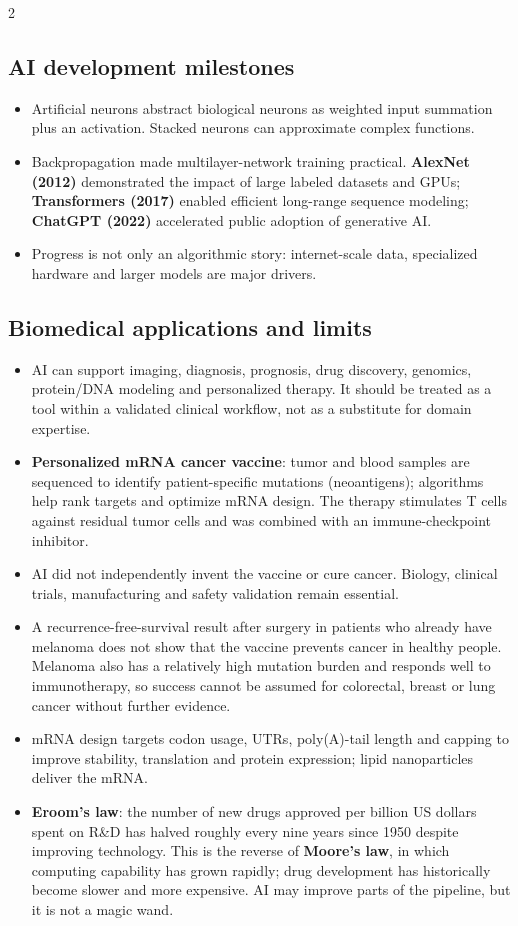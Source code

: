 \documentclass[10pt,a4paper]{ctexart}
\newcommand{\key}[1]{\textbf{#1}}
\begin{document}
\begin{multicols*}{2}
\subsection{AI development milestones}
\begin{itemize}
  \item Artificial neurons abstract biological neurons as weighted input summation plus an activation. 
  Stacked neurons can approximate complex functions.
  \item Backpropagation made multilayer-network training practical. \key{AlexNet (2012)} demonstrated the impact of large labeled 
  datasets and GPUs; \key{Transformers (2017)} enabled efficient long-range sequence modeling; \key{ChatGPT (2022)} accelerated 
  public adoption of generative AI.
  \item Progress is not only an algorithmic story: internet-scale data, specialized hardware and larger models are major drivers.
\end{itemize}

\subsection{Biomedical applications and limits}
\begin{itemize}
  \item AI can support imaging, diagnosis, prognosis, drug discovery, genomics, protein/DNA modeling and personalized therapy. 
  It should be treated as a tool within a validated clinical workflow, not as a substitute for domain expertise.
  \item \key{Personalized mRNA cancer vaccine}: tumor and blood samples are sequenced to identify 
  patient-specific mutations (neoantigens); algorithms help rank targets and optimize mRNA design. 
  The therapy stimulates T cells against residual tumor cells and was combined with an immune-checkpoint inhibitor.
  \item AI did not independently invent the vaccine or cure cancer. Biology, clinical trials, 
  manufacturing and safety validation remain essential.
  \item A recurrence-free-survival result after surgery in patients who already have melanoma
  does not show that the vaccine prevents cancer in healthy people. Melanoma also has a relatively
  high mutation burden and responds well to immunotherapy, so success cannot be assumed for
  colorectal, breast or lung cancer without further evidence.
  \item mRNA design targets codon usage, UTRs, poly(A)-tail length and capping to improve stability, 
  translation and protein expression; lipid nanoparticles deliver the mRNA.
  \item \key{Eroom's law}: the number of new drugs approved per billion US dollars spent on R\&D has halved roughly 
  every nine years since 1950 despite improving technology. This is the reverse of \key{Moore's law},
  in which computing capability has grown rapidly; drug development has historically become slower and more expensive.
  AI may improve parts of the pipeline, but it is not a magic wand.
\end{itemize}


\end{multicols*}
\end{document}

